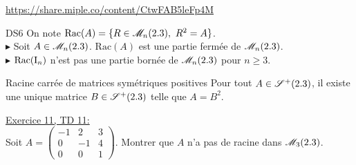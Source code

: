 \url{https://share.miple.co/content/CtwFAB5leFp4M}

\begin{box_titre}{DS6}
    On note $\mathrm{Rac}(A) = \{ R \in \mathscr{M}_n(2.3),\ R^2 = A \}$. \\
    $\blacktriangleright$ Soit $A \in \mathscr{M}_n(2.3)$. $\mathrm{Rac}(A)$ est une partie fermée de $\mathscr{M}_n(2.3)$. \\
    $\blacktriangleright$ $\mathrm{Rac}(\mathrm{I}_n)$ n'est pas une partie bornée de $\mathscr{M}_n(2.3)$ pour $n \geqslant 3$. 
\end{box_titre}

\begin{box_titre}{Racine carrée de matrices symétriques positives}
    Pour tout $A \in \mathscr{S}^+(2.3)$, il existe une unique matrice $B \in \mathscr{S}^+(2.3)$ telle que $A = B^2$. 
\end{box_titre}

\begin{exercice}
    \underline{Exercice 11, TD 11:}\\
    Soit $A = 
    \begin{pmatrix}
        -1 & 2 & 3 \\
        0 & - 1 & 4 \\
        0 & 0 & 1
    \end{pmatrix}. 
    $ Montrer que $A$ n'a pas de racine dans $\mathscr{M}_3(2.3)$. 
\end{exercice}

